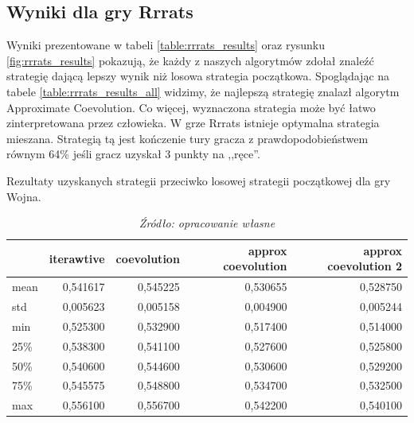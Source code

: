 \documentclass[inzynierska]{pwr_wmat_praca_dyplomowa}
\theoremstyle{plain}
\numberwithin{theorem}{chapter}
\theoremstyle{definition}
\numberwithin{theorem}{chapter}
\begin{document}
	\subsection*{Wyniki dla gry Rrrats}
	Wyniki prezentowane w tabeli \ref{table:rrrats_results} oraz rysunku \ref{fig:rrrats_results} pokazują, że każdy z naszych algorytmów zdołał znaleźć strategię dającą lepszy wynik niż losowa strategia początkowa. Spoglądając na tabele \ref{table:rrrats_results_all} widzimy, że najlepszą strategię znalazł algorytm Approximate Coevolution.
	Co więcej, wyznaczona strategia może być łatwo zinterpretowana przez człowieka.
	W grze Rrrats istnieje optymalna strategia mieszana. Strategią tą jest kończenie tury gracza z prawdopodobieństwem równym 64\% jeśli gracz uzyskał 3 punkty na ,,ręce''.
	\begin{table}
		\begin{center}
			\caption{Rezultaty uzyskanych strategii przeciwko losowej strategii początkowej dla gry Wojna.}
			\small
			\begin{tabular}{lrrrr}
				\toprule
				{} &  iterawtive &  coevolution &  approx coevolution &  approx coevolution 2 \\
				\midrule
				mean  &    0,541617 &     0,545225 &             0,530655 &               0,528750 \\
				std   &    0,005623 &     0,005158 &             0,004900 &               0,005244 \\
				min   &    0,525300 &     0,532900 &             0,517400 &               0,514000 \\
				25\%   &    0,538300 &     0,541100 &             0,527600 &               0,525800 \\
				50\%   &    0,540600 &     0,544600 &             0,530600 &               0,529200 \\
				75\%   &    0,545575 &     0,548800 &             0,534700 &               0,532500 \\
				max   &    0,556100 &     0,556700 &             0,542200 &               0,540100 \\
				\bottomrule
			\end{tabular}
			\caption*{\textit{Źródło: opracowanie własne}}
			\label{table:war_results}
		\end{center}
	\end{table}
\end{document}
